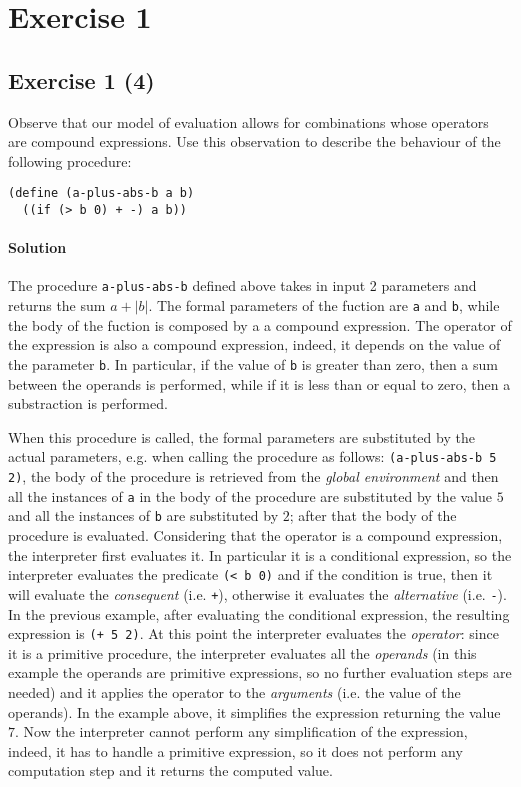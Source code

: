 \section*{Exercise 1}

\subsection*{Exercise 1 (4)}
Observe that our model of evaluation allows for combinations whose operators are compound expressions. Use this observation to 
describe the behaviour of the following procedure:

\begin{lstlisting}
(define (a-plus-abs-b a b) 
  ((if (> b 0) + -) a b))
\end{lstlisting}

\paragraph{Solution}
The procedure \texttt{a-plus-abs-b} defined above takes in input 2 parameters and returns the sum $ a + |b| $. 
The formal parameters of the fuction are \texttt{a} and \texttt{b}, while the body of the fuction is composed by a 
a compound expression. The operator of the expression is also a compound expression, indeed, it depends on the value of the
parameter \texttt{b}. In particular, if the value of \texttt{b} is greater than zero, then a sum between the operands is performed,
while if it is less than or equal to zero, then a substraction is performed.

When this procedure is called, the formal parameters are substituted by the actual parameters, e.g. when calling the procedure as
follows: \texttt{(a-plus-abs-b 5 2)}, the body of the procedure is retrieved from the \textit{global environment} and then 
all the instances of \texttt{a} in the body of the procedure are substituted by the value
$ 5 $ and all the instances of \texttt{b} are substituted by $ 2 $; after that the body of the procedure is evaluated.
Considering that the operator is a compound expression, the interpreter first evaluates it. 
In particular it is a conditional  expression, so the interpreter evaluates the predicate \texttt{(< b 0)} 
and if the condition is true, then it will evaluate the \textit{consequent} (i.e. \texttt{+}), otherwise it evaluates the 
\textit{alternative} (i.e. \texttt{-}).
In the previous example, after evaluating the conditional expression, the resulting expression is \texttt{(+ 5 2)}.
At this point the interpreter evaluates the \textit{operator}: since it is a primitive procedure, the interpreter evaluates all the 
\textit{operands} (in this example the operands are primitive expressions, so no further evaluation steps are needed) and it
applies the operator to the \textit{arguments} (i.e. the value of the operands).
In the example above, it simplifies the expression returning the value $7$.
Now the interpreter cannot perform any simplification of the expression, indeed, it has to handle a primitive expression, so 
it does not perform any computation step and it returns the computed value.


